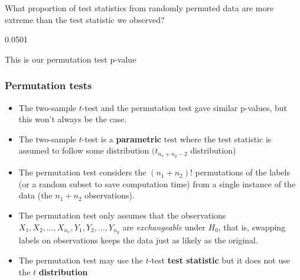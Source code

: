 \documentclass[a4paper]{article}\usepackage[]{graphicx}\usepackage[]{xcolor}
\begin{document}
What proportion of test statistics from randomly permuted data are more extreme than the test statistic we observed?
\begin{Schunk}
\begin{Soutput}
[1] 0.0501
\end{Soutput}
\end{Schunk}
This is our \textcolor{mygreen}{permutation test p-value}
\subsubsection{Permutation tests}
\begin{itemize}
	\item The two-sample \( t \)-test and the permutation test gave similar p-values, but this won't always be the case.
	\item The two-sample \( t \)-test is a \textcolor{myred}{\textbf{parametric}} test where the test statistic is assumed to follow some distribution \( (t_{n_{x}+n_{y}-2} \) distribution)
	\item The permutation test considers the \( (n_1 + n_2)! \) permutations of the labels (or a random subset to save computation time) from a single instance of the data (the \( n_1 + n_2 \) observations).
	\item The permutation test only assumes that the observations \( X_1,X_2,\dotsc,X_{n_x}, Y_1,Y_2,\dotsc,Y_{n_y} \) are \textit{exchangeable} under \( H_0 \), that is, swapping labels on observations keeps the data just as likely as the original.
	\item The permutation test may use the \( t \)-test \textcolor{mygreen}{\textbf{test statistic}} but it does not use the \( t \) \textbf{distribution}
\end{itemize}
\end{document}
